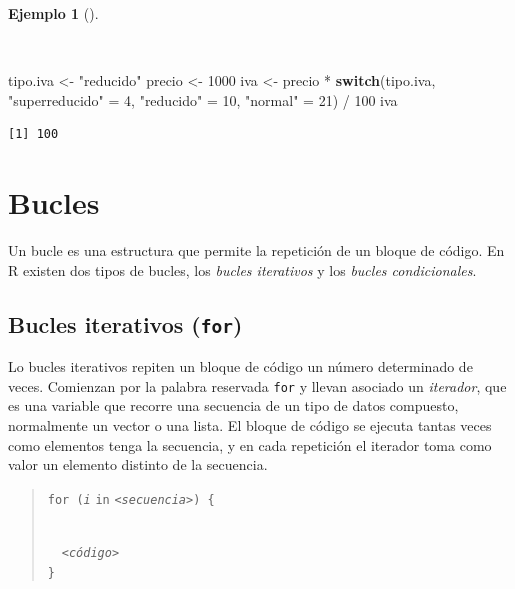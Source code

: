 \documentclass[
  a4paper,
]{scrreport}
\newenvironment{Shaded}{\begin{snugshade}}{\end{snugshade}}
\newcommand{\ControlFlowTok}[1]{\textcolor[rgb]{0.00,0.23,0.31}{\textbf{#1}}}
\newcommand{\DecValTok}[1]{\textcolor[rgb]{0.68,0.00,0.00}{#1}}
\newcommand{\NormalTok}[1]{\textcolor[rgb]{0.00,0.23,0.31}{#1}}
\newcommand{\OtherTok}[1]{\textcolor[rgb]{0.00,0.23,0.31}{#1}}
\newcommand{\SpecialCharTok}[1]{\textcolor[rgb]{0.37,0.37,0.37}{#1}}
\newcommand{\StringTok}[1]{\textcolor[rgb]{0.13,0.47,0.30}{#1}}
\theoremstyle{definition}
\theoremstyle{definition}
\newtheorem{example}{Ejemplo}[chapter]
\theoremstyle{remark}
\begin{document}
\begin{example}[]\protect\hypertarget{exm-condicional-switch}{}\label{exm-condicional-switch}

~

\begin{Shaded}
\begin{Highlighting}[]
\NormalTok{tipo.iva }\OtherTok{\textless{}{-}} \StringTok{"reducido"}
\NormalTok{precio }\OtherTok{\textless{}{-}} \DecValTok{1000}
\NormalTok{iva }\OtherTok{\textless{}{-}}\NormalTok{ precio }\SpecialCharTok{*} \ControlFlowTok{switch}\NormalTok{(tipo.iva, }\StringTok{"superreducido"} \OtherTok{=} \DecValTok{4}\NormalTok{, }\StringTok{"reducido"} \OtherTok{=} \DecValTok{10}\NormalTok{, }\StringTok{"normal"} \OtherTok{=} \DecValTok{21}\NormalTok{) }\SpecialCharTok{/} \DecValTok{100}
\NormalTok{iva}
\end{Highlighting}
\end{Shaded}

\begin{verbatim}
[1] 100
\end{verbatim}

\end{example}

\section{Bucles}\label{bucles}

Un bucle es una estructura que permite la repetición de un bloque de
código. En R existen dos tipos de bucles, los \emph{bucles iterativos} y
los \emph{bucles condicionales}.

\subsection{\texorpdfstring{Bucles iterativos
(\texttt{for})}{Bucles iterativos (for)}}\label{bucles-iterativos-for}

Lo bucles iterativos repiten un bloque de código un número determinado
de veces. Comienzan por la palabra reservada \texttt{for} y llevan
asociado un \emph{iterador}, que es una variable que recorre una
secuencia de un tipo de datos compuesto, normalmente un vector o una
lista. El bloque de código se ejecuta tantas veces como elementos tenga
la secuencia, y en cada repetición el iterador toma como valor un
elemento distinto de la secuencia.

\begin{quote}
\texttt{for\ (}\emph{\texttt{i}} \texttt{in}
\emph{\texttt{\textless{}secuencia\textgreater{}}}\texttt{)\ \{}\strut \\
  \emph{\texttt{\textless{}código\textgreater{}}}\\
\texttt{\}}
\end{quote}
\end{document}

